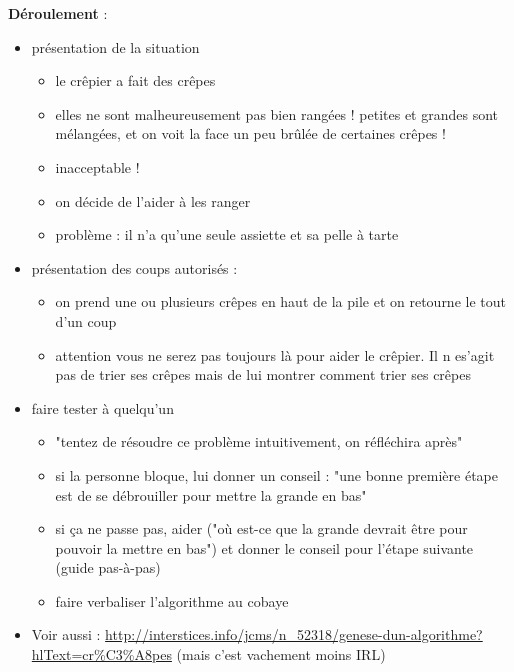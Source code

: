 \documentclass{article}
\newcommand{\titre}[1]{\medskip\noindent\textbf{#1} : }
\newcommand{\deroulement}{\titre{Déroulement}}
\begin{document}
\deroulement
\begin{itemize}
\item présentation de la situation
\begin{itemize}
\item le crêpier a fait des crêpes
\item elles ne sont malheureusement pas bien rangées ! petites et grandes sont mélangées, et on voit la face un peu brûlée de certaines crêpes !
\item inacceptable !
\item on décide de l'aider à les ranger
\item problème : il n'a qu'une seule assiette et sa pelle à tarte
\end{itemize}
\item présentation des coups autorisés :
\begin{itemize}

\item on prend une ou plusieurs crêpes en haut de la pile et on retourne le
tout d'un coup

\item attention vous ne serez pas toujours là pour aider le crêpier. Il n
es'agit pas de trier ses crêpes mais de lui montrer comment trier ses crêpes

\end{itemize}
\item faire tester à quelqu'un
\begin{itemize}

\item "tentez de résoudre ce problème intuitivement, on réfléchira après"

\item si la personne bloque, lui donner un conseil : "une bonne première étape
est de se débrouiller pour mettre la grande en bas"

\item si ça ne passe pas, aider ("où est-ce que la grande devrait être pour
pouvoir la mettre en bas") et donner le conseil pour l'étape suivante (guide
pas-à-pas)

\item faire verbaliser l'algorithme au cobaye

\end{itemize}

\item Voir aussi :
\url{http://interstices.info/jcms/n_52318/genese-dun-algorithme?hlText=cr%C3%A8pes}
(mais c'est vachement moins IRL)

\end{itemize}
\end{document}
